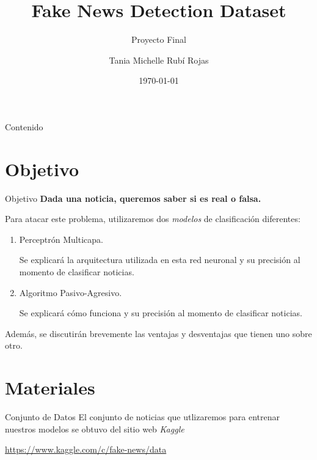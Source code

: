 \documentclass[11pt]{beamer}
\author{Tania Michelle Rubí Rojas}
\title[Fake News Detection Dataset]{Fake News Detection Dataset}
\date{\today}
\subtitle{Proyecto Final}
\institute[UNAM]{Facultad de Ciencias, UNAM}
\begin{document}
\begin{frame}
\maketitle
\end{frame}

\begin{frame}{Contenido}
\tableofcontents
\end{frame}

\section{Objetivo}
\begin{frame}{Objetivo}
\justifying
\textbf{Dada una noticia, queremos saber si es real o falsa.}

Para atacar este problema, utilizaremos dos \textit{modelos} de 
clasificación diferentes:
\begin{enumerate}
    \item Perceptrón Multicapa.
    
    Se explicará la arquitectura utilizada en esta red neuronal
    y su precisión al momento de clasificar noticias.
    \item Algoritmo Pasivo-Agresivo.
    
    Se explicará cómo funciona y su precisión al momento de 
    clasificar noticias.
\end{enumerate}

Además, se discutirán brevemente las ventajas y desventajas que
tienen uno sobre otro.  
\end{frame}
	
\section{Materiales}
\begin{frame}{Conjunto de Datos}
    \justifying
    El conjunto de noticias que utlizaremos para entrenar nuestros modelos
    se obtuvo del sitio web \textit{Kaggle}
    \begin{center}
        \url{https://www.kaggle.com/c/fake-news/data}
    \end{center}
\end{frame}
\end{document}
